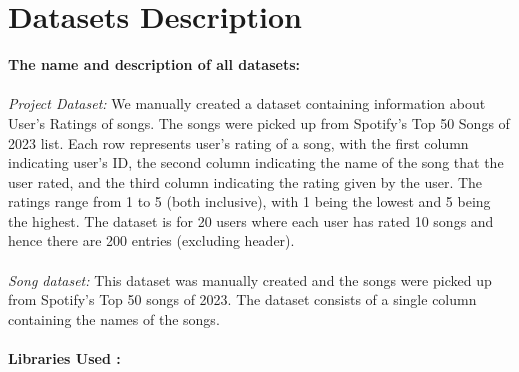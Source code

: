 \documentclass[fontsize=11pt]{article}
\begin{document}
\section*{Datasets Description}
\textbf{The name and description of all datasets:}
\\\\
\textit{Project Dataset:} We manually created a dataset containing information about User’s Ratings of songs. The songs were picked up from Spotify’s Top 50 Songs of 2023 list. Each row represents user’s rating of a song, with the first column indicating user’s ID, the second column indicating the name of the song that the user rated, and the third column indicating the rating given by the user. The ratings range from 1 to 5 (both inclusive), with 1 being the lowest and 5 being the highest. The dataset is for 20 users where each user has rated 10 songs and hence there are 200 entries (excluding header).
\\\\
\textit{Song dataset:} This dataset was manually created and  the songs were picked up from Spotify’s Top 50 songs of 2023.  The dataset consists of a single column containing the names of the songs. 
\\\\
\textbf{Libraries Used :}
\end{document}
